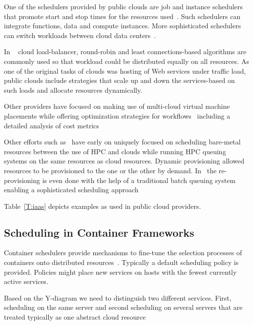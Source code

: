 \documentclass[final,5p,times,twocolumn]{elsarticle}
\begin{document}
One of the schedulers provided by public clouds are job and instance schedulers that promote start and stop times for the resources used~\cite{AWSIns2019,AzureSch2019,Rackspace2016,GoogleAppEngine2018}. Such schedulers can integrate functions, data and compute instances. More sophisticated schedulers can switch workloads between cloud data centers~\cite{MicrosoftAzure2014}.

In ~\cite{Rackspace2016} cloud load-balancer, round-robin and least connections-based algorithms are commonly used so that workload could be distributed equally on all resources. As one of the original tasks of clouds was hosting of Web services under traffic load, public clouds include strategies that scale up and down the services-based on such loads and allocate resources dynamically.

Other providers have focused on making use of multi-cloud virtual machine placements while offering optimization strategies for workflows~\cite{CloudSigma2016} including a detailed analysis of cost metrics~\cite{Cloudmetrics2019}

Other efforts such as~\cite{las12fg-bookchapter} have early on uniquely focused on scheduling bare-metal resources between the use of HPC and clouds while running HPC queuing systems on the same resources as cloud resources. Dynamic provisioning allowed resources to be provisioned to the one or the other by demand. In~\cite{las-comet} the re-provisioning is even done with the help of a traditional batch queuing system enabling a sophisticated scheduling approach

Table~\ref{T:iaas} depicts examples as used in public cloud providers.



%


\subsection{Scheduling in Container Frameworks}
\label{sec:container}


Container schedulers provide mechanisms to fine-tune the selection processes of containers onto distributed resources~\cite{Containers2018,de2018distributed}. Typically a default scheduling policy is provided. Policies might place new services on hosts with the fewest currently active services.

Based on the Y-diagram we need to distinguish two different services. First, scheduling on the same server and second scheduling on several servers that are treated typically as one abstract cloud resource
\end{document}
